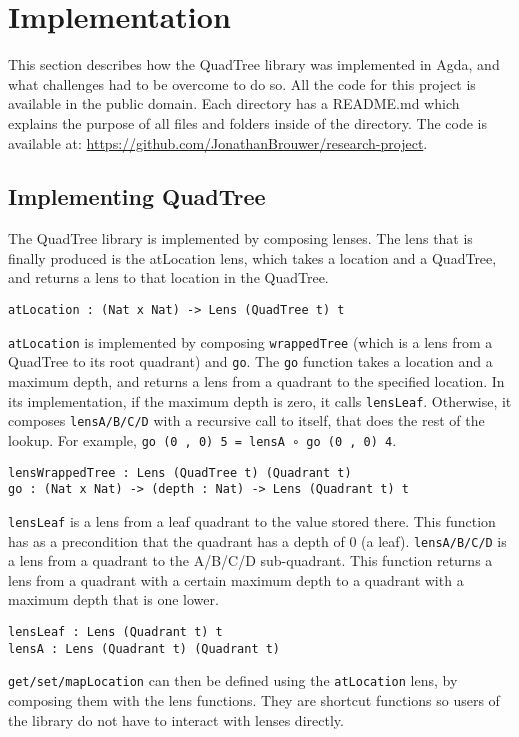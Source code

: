 \section{Implementation} \label{implementation}
This section describes how the QuadTree library was implemented in Agda, and what challenges had to be overcome to do so. All the code for this project is available in the public domain. Each directory has a README.md which explains the purpose of all files and folders inside of the directory.
The code is available at: \textcolor{blue}{\href{https://github.com/JonathanBrouwer/research-project}{https://github.com/JonathanBrouwer/research-project}}. 

\subsection{Implementing QuadTree}
The QuadTree library is implemented by composing lenses. The lens that is finally produced is the atLocation lens, which takes a location and a QuadTree, and returns a lens to that location in the QuadTree.
\begin{verbatim}
atLocation : (Nat x Nat) -> Lens (QuadTree t) t
\end{verbatim}
 \verb|atLocation| is implemented by composing \verb|wrappedTree| (which is a lens from a QuadTree to its root quadrant) and  \verb|go|.   The \verb|go| function takes a location and a maximum depth, and returns a lens from a quadrant to the specified location. In its implementation, if the maximum depth is zero, it calls  \verb|lensLeaf|. Otherwise, it composes  \verb|lensA/B/C/D| with a recursive call to itself, that does the rest of the lookup. For example, \verb|go (0 , 0) 5 = lensA ∘ go (0 , 0) 4|.
\begin{verbatim}
lensWrappedTree : Lens (QuadTree t) (Quadrant t)
go : (Nat x Nat) -> (depth : Nat) -> Lens (Quadrant t) t
\end{verbatim}
 \verb|lensLeaf| is a lens from a leaf quadrant to the value stored there. This function has as a precondition that the quadrant has a depth of 0 (a leaf).  \verb|lensA/B/C/D| is a lens from a quadrant to the A/B/C/D sub-quadrant. This function returns a lens from a quadrant with a certain maximum depth to a quadrant with a maximum depth that is one lower. 
\begin{verbatim}
lensLeaf : Lens (Quadrant t) t
lensA : Lens (Quadrant t) (Quadrant t)
\end{verbatim}
 \verb|get/set/mapLocation| can then be defined using the  \verb|atLocation| lens, by composing them with the lens functions. They are shortcut functions so users of the library do not have to interact with lenses directly.

